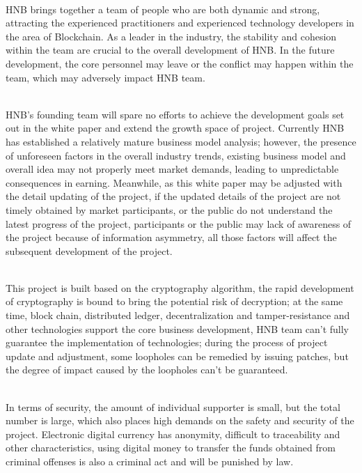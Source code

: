 \documentclass[fleqn,10pt]{SelfArx} %
\begin{document}
\\
HNB brings together a team of people who are both dynamic and strong, attracting the experienced practitioners and experienced technology developers in the area of Blockchain. As a leader in the industry, the stability and cohesion within the team are crucial to the overall development of HNB. In the future development, the core personnel may leave or the conflict may happen within the team, which may adversely impact HNB team.

\\
HNB’s founding team will spare no efforts to achieve the development goals set out in the white paper and extend the growth space of project. Currently HNB has established a relatively mature business model analysis; however, the presence of unforeseen factors in the overall industry trends, existing business model and overall idea may not properly meet market demands, leading to unpredictable consequences in earning. Meanwhile, as this white paper may be adjusted with the detail updating of the project, if the updated details of the project are not timely obtained by market participants, or the public do not understand the latest progress of the project, participants or the public may lack of awareness of the project because of information asymmetry, all those factors will affect the subsequent development of the project.

\\
This project is built based on the cryptography algorithm, the rapid development of cryptography is bound to bring the potential risk of decryption; at the same time, block chain, distributed ledger, decentralization and tamper-resistance and other technologies support the core business development, HNB team can’t fully guarantee the implementation of technologies; during the process of project update and adjustment, some loopholes can be remedied by issuing patches, but the degree of impact caused by the loopholes can’t be guaranteed.

\\
In terms of security, the amount of individual supporter is small, but the total number is large, which also places high demands on the safety and security of the project. Electronic digital currency has anonymity, difficult to traceability and other characteristics, using digital money to transfer the funds obtained from criminal offenses is also a criminal act and will be punished by law.
\end{document}
